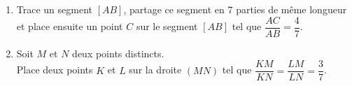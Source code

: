 
\begin{enumerate}
  \item Trace un segment $[AB]$, partage ce segment en 7 parties de même longueur et place ensuite un point $C$ sur le segment $[AB]$ tel que $\dfrac{AC}{AB}=\dfrac47$.
  \item Soit $M$ et $N$ deux points distincts.\\Place deux points $K$ et $L$ sur la droite $(MN)$ tel que $\dfrac{KM}{KN}=\dfrac{LM}{LN}=\dfrac37$.
\end{enumerate}